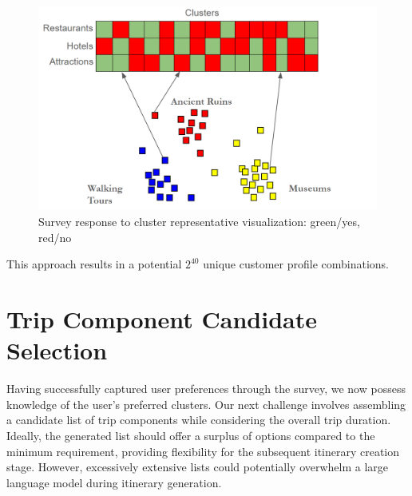 \documentclass[12pt,a4paper]{report}
\begin{document}
\begin{figure}[H]
    \centering
    \includegraphics[scale=.6]{surveytoclusters}
    \caption{Survey response to cluster representative visualization: green/yes, red/no}
\end{figure}

This approach results in a potential $2^{40}$ unique customer profile combinations.

\section{Trip Component Candidate Selection}
Having successfully captured user preferences through the survey, we now possess knowledge of the user's preferred clusters.  Our next challenge involves assembling a candidate list of trip components while considering the overall trip duration.  Ideally, the generated list should offer a surplus of options compared to the minimum requirement, providing flexibility for the subsequent itinerary creation stage.  However, excessively extensive lists could potentially overwhelm a large language model during itinerary generation.
\end{document}
